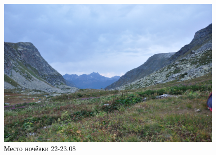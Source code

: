 \begin{figure}[h!]
	\centering
	\includegraphics[width=0.7\linewidth]{../pics/DSC_0018}
	\caption{Место ночёвки 22-23.08}
	\label{fig:DSC_0018}
\end{figure}
\newpage